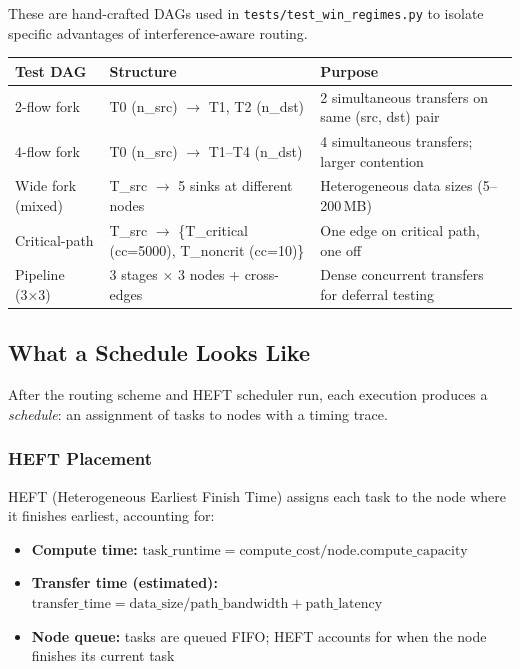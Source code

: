 \documentclass[11pt]{article}
\begin{document}
These are hand-crafted DAGs used in \texttt{tests/test\_win\_regimes.py} to
isolate specific advantages of interference-aware routing.

\begin{table}[h]
\centering
\small
\begin{tabular}{lp{4cm}p{5.5cm}}
\toprule
\textbf{Test DAG} & \textbf{Structure} & \textbf{Purpose} \\
\midrule
2-flow fork       & T0 (n\_src) $\to$ T1, T2 (n\_dst) & 2 simultaneous transfers on same (src, dst) pair \\
4-flow fork       & T0 (n\_src) $\to$ T1--T4 (n\_dst) & 4 simultaneous transfers; larger contention \\
Wide fork (mixed) & T\_src $\to$ 5 sinks at different nodes & Heterogeneous data sizes (5--200\,MB) \\
Critical-path     & T\_src $\to$ \{T\_critical (cc=5000), T\_noncrit (cc=10)\} & One edge on critical path, one off \\
Pipeline (3×3)    & 3 stages $\times$ 3 nodes + cross-edges & Dense concurrent transfers for deferral testing \\
\bottomrule
\end{tabular}
\end{table}

\subsection{What a Schedule Looks Like}

After the routing scheme and HEFT scheduler run, each execution produces a
\emph{schedule}: an assignment of tasks to nodes with a timing trace.

\subsubsection{HEFT Placement}

HEFT (Heterogeneous Earliest Finish Time) assigns each task to the node
where it finishes earliest, accounting for:
\begin{itemize}
  \item \textbf{Compute time:} $\text{task\_runtime} = \text{compute\_cost} /
        \text{node.compute\_capacity}$
  \item \textbf{Transfer time (estimated):} $\text{transfer\_time} =
        \text{data\_size} / \text{path\_bandwidth} + \text{path\_latency}$
  \item \textbf{Node queue:} tasks are queued FIFO; HEFT accounts for when
        the node finishes its current task
\end{itemize}
\end{document}
